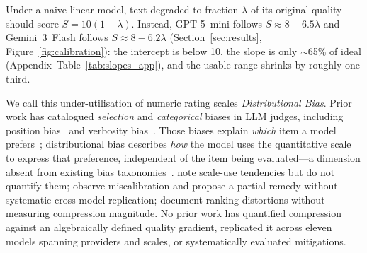 \documentclass[11pt]{article}
\begin{document}
Under a naive linear model, text degraded to fraction $\lambda$ of its
original quality should score $S = 10(1 - \lambda)$. Instead, GPT-5~mini
follows $S \approx 8 - 6.5\lambda$ and Gemini~3~Flash follows $S
\approx 8 - 6.2\lambda$ (Section~\ref{sec:results},
Figure~\ref{fig:calibration}): the intercept is below 10, the slope is
only $\sim$65\% of ideal (Appendix~Table~\ref{tab:slopes_app}), and the
usable range shrinks by roughly one third.

We call this under-utilisation of numeric rating scales \emph{Distributional
Bias}. Prior work has catalogued \emph{selection} and \emph{categorical}
biases in LLM judges, including position
bias~\citep{zheng2023judging,shi2024judging} and verbosity
bias~\citep{zheng2023judging}. Those biases explain \emph{which} item a
model prefers~\citep{wang2024large}; distributional bias describes
\emph{how} the model uses the quantitative scale to express that
preference, independent of the item being evaluated---a dimension absent
from existing bias taxonomies~\citep{zheng2023judging,wang2024large,liu2023geval}.
\citet{zheng2023judging} note scale-use tendencies but do not quantify
them; \citet{liu2023geval} observe miscalibration and propose a partial
remedy without systematic cross-model replication; \citet{wang2024large}
document ranking distortions without measuring compression magnitude.
No prior work has quantified compression against an algebraically
defined quality gradient, replicated it across eleven models spanning
providers and scales, or systematically evaluated mitigations.
\end{document}
